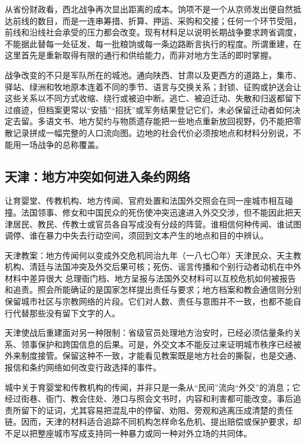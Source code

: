 从省份财政看，西北战争再次显出距离的成本。饷项不是一个从京师发出便自然抵达前线的数目，而是一连串筹措、折算、押运、采购和交接；任何一个环节受阻，前线和沿线社会承受的压力都会改变。现有材料足以说明长期战争要求跨省调度，不能据此替每一处征发、每一批粮饷或每一条边路断言执行的程度。所谓重建，在这里首先是重新取得有限的通行和供给能力，而非对地方生活的即时掌握。

战争改变的不只是军队所在的城池。通向陕西、甘肃以及更西方的道路上，集市、驿站、绿洲和牧地原本连着不同的季节、语言与交换关系；封锁、征购或护送会让这些关系以不同方式收缩、绕行或被迫中断。逃亡、被迫迁动、失散和归返都留下过痕迹，但档案更常以“安插”“招抚”或军务结果登记它们，未必保留迁动者如何决定去留。多语文书、地方契约与物质遗存能把一些地点重新放回视野，仍不能把零散记录拼成一幅完整的人口流向图。边地的社会代价必须按地点和材料分别说，不能用一场战争的总称覆盖。

\subsection{天津：地方冲突如何进入条约网络}

让育婴堂、传教机构、地方传闻、官府处置和法国外交照会在同一座城市相互碰撞。法国领事、修女和中国民众的死伤使冲突迅速进入外交交涉，但不能因此把天津居民、教民、传教士或官员各自写成没有分歧的阵营。谁相信何种传闻、谁试图调停、谁在暴力中失去行动空间，须回到文本产生的地点和目的中辨认。

\begin{event}{天津教案：地方传闻何以变成外交危机}{同治九年（一八七〇年）}{天津民众、天主教机构、清廷与法国}{冲突及外交后果可核；死伤、谣言传播和个别行动者动机在中外材料中差异很大}
总理衙门档、地方呈报与法国外交材料可以互校危机如何被报告和追责。照会所能确证的是国家怎样提出责任与要求；地方档案和教会通信则分别保留城市社区与宗教网络的片段。它们对人数、责任与意图并不一致，也都不能自行代替那些没有留下文字的人。

天津使战后重建面对另一种限制：省级官员处理地方治安时，已经必须估量条约关系、领事保护和跨国信息的后果。可是，外交文本不能反过来证明城市秩序已经被外来制度接管。保留这种不一致，才能看见教案既是地方社会的撕裂，也是交通、报信和条约网络如何改变行政选择的事件。

城中关于育婴堂和传教机构的传闻，并非只是一条从“民间”流向“外交”的消息；它经过街巷、衙门、教会住处、港口与照会文书时，内容和利害都可能改变。事后追责所留下的证词，尤其容易把混乱中的停留、劝阻、旁观和逃离压成清楚的责任链。因而，天津的材料适合追踪不同机构怎样命名危机、提出赔偿或保护要求，却不足以把整座城市写成支持同一种暴力或同一种对外立场的共同体。
\end{event}

